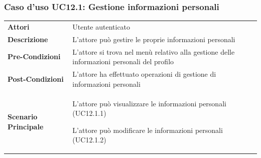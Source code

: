 \subsubsection{Caso d'uso UC12.1: Gestione informazioni personali}
\label{UC12_1}

\begin{minipage}{\linewidth}
	\begin{tabular}{ l | p{11cm}}
		\hline
		\rowcolor{Gray}
		\multicolumn{2}{c}{UC12.1 - Gestione informazioni personali} \\
		\hline
		\textbf{Attori} & Utente autenticato \\
		\textbf{Descrizione} & L'attore può gestire le proprie informazioni personali\\
		\textbf{Pre-Condizioni} & L'attore si trova nel menù relativo alla gestione delle informazioni personali del profilo\\
		\textbf{Post-Condizioni} & L'attore ha effettuato operazioni di gestione di informazioni personali \\
		\textbf{Scenario Principale} & 
		\begin{enumerate*}[label=(\arabic*.),itemjoin={\newline}]
			\item L'attore può visualizzare le informazioni personali (UC12.1.1)
			\item L'attore può modificare le informazioni personali (UC12.1.2)
		\end{enumerate*}
	\end{tabular}
\end{minipage}

\newpage
